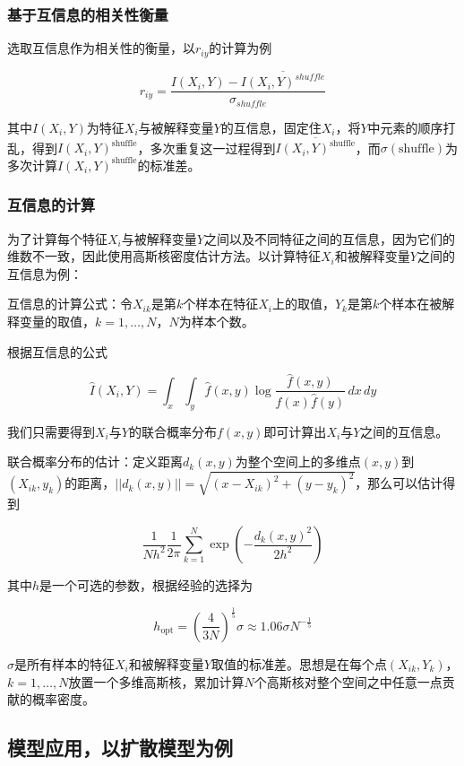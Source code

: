 \documentclass{article}
\begin{document}
\subsubsection{基于互信息的相关性衡量\cite{belghazi2018mutual}\cite{steuer2002mutual}}

选取互信息作为相关性的衡量，以$r_{iy}$的计算为例

\[
r_{iy} = \frac{I(X_i, Y) - \overline{I(X_i, Y)^{shuffle}}}{\sigma_{shuffle}}
\]

其中$I(X_i, Y)$为特征$X_i$与被解释变量$Y$的互信息，固定住$X_i$，将$Y$中元素的顺序打乱，得到$I(X_i, Y)^{\text{shuffle}}$，多次重复这一过程得到$\overline{I(X_i, Y)^{\text{shuffle}}}$，而$\sigma(\text{shuffle})$为多次计算$I(X_i, Y)^{\text{shuffle}}$的标准差。

\subsubsection{互信息的计算\cite{hu2024infonet}\cite{xiong2016credit}}

为了计算每个特征$X_i$与被解释变量$Y$之间以及不同特征之间的互信息，因为它们的维数不一致，因此使用高斯核密度估计方法。以计算特征$X_i$和被解释变量$Y$之间的互信息为例：

互信息的计算公式：令$X_{ik}$是第$k$个样本在特征$X_i$上的取值，$Y_k$是第$k$个样本在被解释变量的取值，$k=1,\ldots,N$，$N$为样本个数。

根据互信息的公式

\[
\hat{I}(X_i, Y) = \int_{x} \int_{y} \hat{f}(x, y) \log \frac{\hat{f}(x, y)}{\hat{f}(x) \hat{f}(y)} \, dx \, dy
\]

我们只需要得到$X_i$与$Y$的联合概率分布$f(x, y)$即可计算出$X_i$与$Y$之间的互信息。

联合概率分布的估计：定义距离$d_k(x, y)$为整个空间上的多维点$(x, y)$到$(X_{ik}, y_k)$的距离，$||d_k(x, y)|| = \sqrt{(x - X_{ik})^2 + (y - y_k)^2}$，那么可以估计得到

\[
\frac{1}{Nh^2} \frac{1}{2\pi} \sum_{k=1}^{N} \exp\left(-\frac{d_k(x, y)^2}{2h^2}\right)
\]

其中$h$是一个可选的参数，根据经验的选择为

\[
h_{\text{opt}} = \left(\frac{4}{3N}\right)^{\frac{1}{5}} \sigma \approx 1.06 \sigma N^{-\frac{1}{5}}
\]


$\sigma$是所有样本的特征$X_i$和被解释变量$Y$取值的标准差。思想是在每个点$(X_{ik}, Y_k)$，$k=1,\ldots,N$放置一个多维高斯核，累加计算$N$个高斯核对整个空间之中任意一点贡献的概率密度。

\subsection{模型应用，以扩散模型为例\cite{cheng2019dynamic}}
\end{document}
